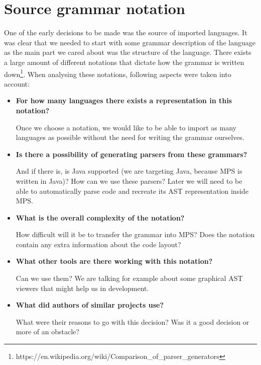 \chapter{Source grammar notation}
\label{chap:source_grammar_notation}

One of the early decisions to be made was the source of imported languages. It was clear that we needed to start with some grammar description of the language as the main part we cared about was the structure of the language. There exists a large amount of different notations that dictate how the grammar is written down\footnote{https://en.wikipedia.org/wiki/Comparison{\_}of{\_}parser{\_}generators}. When analysing these notations, following aspects were taken into account:

\begin{itemize}
	\item \textbf{For how many languages there exists a representation in this notation?} 
	
	Once we choose a notation, we would like to be able to import as many languages as possible without the need for writing the grammar ourselves.
	
	\item \textbf{Is there a possibility of generating parsers from these grammars?} 
	
	And if there is, is Java supported (we are targeting Java, because MPS is written in Java)? How can we use these parsers? Later we will need to be able to automatically parse code and recreate its AST representation inside MPS. 
	
	\item \textbf{What is the overall complexity of the notation?}
	
	How difficult will it be to transfer the grammar into MPS? Does the notation contain any extra information about the code layout?
	
	\item \textbf{What other tools are there working with this notation?}
	
	Can we use them? We are talking for example about some graphical AST viewers that might help us in development.
	
	\item \textbf{What did authors of similar projects use?}
	
	What were their reasons to go with this decision? Was it a good decision or more of an obstacle?
\end{itemize}

